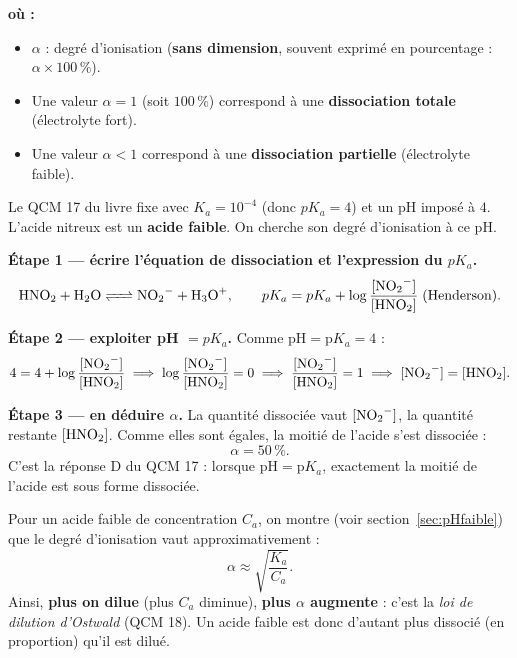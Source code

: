 \documentclass[11pt,a4paper]{article}
\newenvironment{ou}{%
  \par\smallskip\noindent\textbf{où :}\nopagebreak
  \begin{itemize}[leftmargin=1.8em,topsep=2pt,itemsep=1.5pt,parsep=0pt]}%
  {\end{itemize}}
\begin{document}
\begin{ou}
\item $\alpha$ : degré d'ionisation (\textbf{sans dimension}, souvent exprimé en pourcentage : $\alpha \times 100\,\%$).
\item Une valeur $\alpha = 1$ (soit $100\,\%$) correspond à une \textbf{dissociation totale} (électrolyte fort).
\item Une valeur $\alpha < 1$ correspond à une \textbf{dissociation partielle} (électrolyte faible).
\end{ou}

\begin{exemple}
Le QCM 17 du livre fixe  avec $K_a = 10^{-4}$ (donc $pK_a = 4$) et un pH imposé à $4$. L'acide
nitreux est un \textbf{acide faible}. On cherche son degré d'ionisation à ce pH.

\smallskip
\textbf{Étape 1 — écrire l'équation de dissociation et l'expression du $pK_a$.}
\[ \ce{HNO2 + H2O <=> NO2- + H3O+}, \qquad pK_a = pK_a + \log\frac{[\ce{NO2-}]}{[\ce{HNO2}]} \;\text{(Henderson)}. \]

\textbf{Étape 2 — exploiter pH $= pK_a$.} Comme $\mathrm{pH} = \mathrm{p}K_a = 4$ :
\[ 4 = 4 + \log\frac{[\ce{NO2-}]}{[\ce{HNO2}]} \;\Longrightarrow\; \log\frac{[\ce{NO2-}]}{[\ce{HNO2}]} = 0
   \;\Longrightarrow\; \frac{[\ce{NO2-}]}{[\ce{HNO2}]} = 1 \;\Longrightarrow\; [\ce{NO2-}] = [\ce{HNO2}]. \]

\textbf{Étape 3 — en déduire $\alpha$.} La quantité dissociée vaut $[\ce{NO2-}]$, la quantité restante
$[\ce{HNO2}]$. Comme elles sont égales, la moitié de l'acide s'est dissociée :
\[ \boxed{\alpha = 50\,\%}. \]
C'est la réponse D du QCM 17 : lorsque $\mathrm{pH} = \mathrm{p}K_a$, exactement la moitié de l'acide est sous
forme dissociée.
\end{exemple}

\begin{remarque}
Pour un acide faible de concentration $C_a$, on montre (voir section~\ref{sec:pHfaible}) que le degré
d'ionisation vaut approximativement :
\[ \alpha \approx \sqrt{\frac{K_a}{C_a}}. \]
Ainsi, \textbf{plus on dilue} (plus $C_a$ diminue), \textbf{plus $\alpha$ augmente} : c'est la \emph{loi de
dilution d'Ostwald} (QCM 18). Un acide faible est donc d'autant plus dissocié (en proportion) qu'il est dilué.
\end{remarque}

\end{document}
